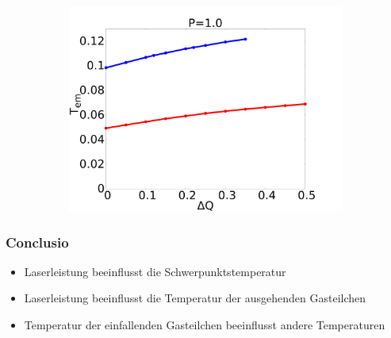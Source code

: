 \documentclass{beamer}
\begin{document}
\begin{frame}
\begin{figure}[h]
\begin{center}
\begin{subfigure}[t]{0.3\textwidth}
            \includegraphics[scale=0.09]{../images/p1_out.pdf}
        \end{subfigure} 
    \end{center}
\end{figure}
\end{frame}



\begin{frame}
\frametitle{Conclusio}
\begin{itemize}
\item Laserleistung beeinflusst die Schwerpunktstemperatur
\item Laserleistung beeinflusst die Temperatur der ausgehenden Gasteilchen 
\item Temperatur der einfallenden Gasteilchen beeinflusst andere Temperaturen 
\end{itemize}
\end{frame}



\end{document}
